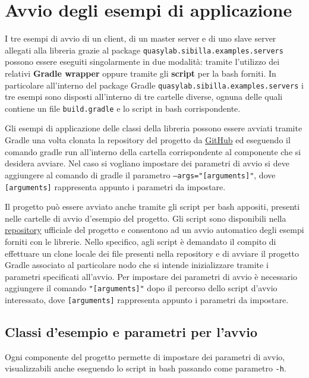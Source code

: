 


\section{Avvio degli esempi di applicazione}
I tre esempi di avvio di un client, di un master server e di uno slave server allegati alla libreria grazie al package \texttt{quasylab.sibilla.examples.servers} possono essere eseguiti singolarmente in due modalità: tramite l’utilizzo dei relativi \textbf{Gradle wrapper} oppure tramite gli \textbf{script} per la bash forniti. In particolare all’interno del package Gradle \texttt{quasylab.sibilla.examples.servers} i tre esempi sono disposti all’interno di tre cartelle diverse, ognuna delle quali contiene un file \texttt{build.gradle} e lo script in bash corrispondente.

Gli esempi di applicazione delle classi della libreria possono essere avviati tramite Gradle una volta clonata la repository del progetto da \href{https://github.com/quasylab/sibilla.git}{GitHub} ed eseguendo il comando gradle run all’interno della cartella corrispondente al componente che si desidera avviare. Nel caso si vogliano impostare dei parametri di avvio si deve aggiungere al comando di gradle il parametro \texttt{--args="[arguments]"}, dove \texttt{[arguments]} rappresenta appunto i parametri da impostare.

Il progetto può essere avviato anche tramite gli script per bash appositi, presenti nelle cartelle di avvio d'esempio del progetto. Gli script sono disponibili nella \href{https://github.com/quasylab/sibilla.git}{repository} ufficiale del progetto e consentono ad un avvio automatico degli esempi forniti con le librerie. Nello specifico, agli script è demandato il compito di effettuare un clone locale dei file presenti nella repository e di avviare il progetto Gradle associato al particolare nodo che si intende inizializzare tramite i parametri specificati all'avvio. Per impostare dei parametri di avvio è necessario aggiungere il comando \texttt{"[arguments]"} dopo il percorso dello script d'avvio interessato, dove \texttt{[arguments]} rappresenta appunto i parametri da impostare.

\subsection{Classi d'esempio e parametri per l'avvio}

Ogni componente del progetto permette di impostare dei parametri di avvio, visualizzabili anche eseguendo lo script in bash passando come parametro \texttt{-h}.

